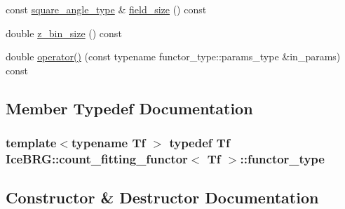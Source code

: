 \begin{DoxyCompactItemize}
\item 
const \hyperlink{namespaceIceBRG_af4db0ce6eb1c82d5b5bc58d9467676ea}{square\+\_\+angle\+\_\+type} \& \hyperlink{classIceBRG_1_1count__fitting__functor_a844118d000e1ba187c616680279ab7b3}{field\+\_\+size} () const 
\item 
double \hyperlink{classIceBRG_1_1count__fitting__functor_a9e8a338d7df32350b3656ced348f7d28}{z\+\_\+bin\+\_\+size} () const 
\item 
double \hyperlink{classIceBRG_1_1count__fitting__functor_a1c394be90cfb3cb75dc57c52d386208d}{operator()} (const typename functor\+\_\+type\+::params\+\_\+type \&in\+\_\+params) const 
\end{DoxyCompactItemize}


\subsection{Member Typedef Documentation}
\hypertarget{classIceBRG_1_1count__fitting__functor_a681f2697a3ad0a5aa13882f0fba0e170}{}
\subsubsection[{functor\+\_\+type}]{\setlength{\rightskip}{0pt plus 5cm}template$<$typename Tf $>$ typedef Tf {\bf Ice\+B\+R\+G\+::count\+\_\+fitting\+\_\+functor}$<$ Tf $>$\+::{\bf functor\+\_\+type}}\label{classIceBRG_1_1count__fitting__functor_a681f2697a3ad0a5aa13882f0fba0e170}


\subsection{Constructor \& Destructor Documentation}
\hypertarget{classIceBRG_1_1count__fitting__functor_ab7dc64ad092fc074141479f3666a9aee}{}
